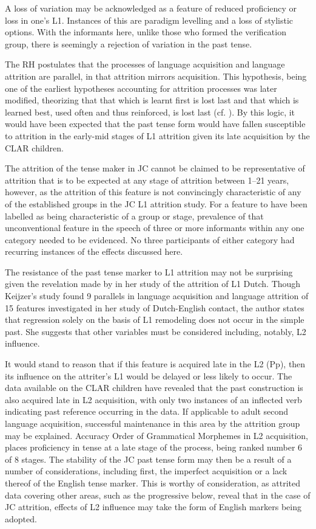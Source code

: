 \documentclass[output=paper,colorlinks,citecolor=brown]{langscibook}
\begin{document}
A loss of variation may be acknowledged as a feature of reduced proficiency or loss in one’s L1.  Instances of this are paradigm levelling and a loss of stylistic options. With the informants here, unlike those who formed the verification group, there is seemingly a rejection of variation in the past tense.


The RH postulates that the processes of language acquisition and language attrition are parallel, in that attrition mirrors acquisition. This hypothesis, being one of the earliest hypotheses accounting for attrition processes was later modified, theorizing that that which is learnt first is lost last and that which is learned best, used often and thus reinforced, is lost last (cf. \citealt[16]{KöpkeSchmid2004}). By this logic, it would have been expected that the past tense form would have fallen susceptible to attrition in the early-mid stages of L1 attrition given its late acquisition by the CLAR children.

The attrition of the tense maker in JC cannot be claimed to be representative of attrition that is to be expected at any stage of attrition between 1--21 years, however, as the attrition of this feature is not convincingly characteristic of any of the established groups in the JC L1 attrition study. For a feature to have been labelled as being characteristic of a group or stage, prevalence of that unconventional feature in the speech of three or more informants within any one category needed to be evidenced. No three participants of either category had recurring instances of the effects discussed here.

The resistance of the past tense marker to L1 attrition may not be surprising given the revelation made by \citet{Keijzer2010} in her study of the attrition of L1 Dutch. Though Keijzer’s study found 9 parallels in language acquisition and language attrition of 15 features investigated in her study of Dutch-English contact, the author states that regression solely on the basis of L1 remodeling does not occur in the simple past. She suggests that other variables must be considered including, notably, L2 influence.

It would stand to reason that if this feature is acquired late in the L2 (Pp), then its influence on the attriter’s L1 would be delayed or less likely to occur. The data available on the CLAR children have revealed that the past construction is also acquired late in L2 acquisition, with only two instances of an inflected verb indicating past reference occurring in the data. If applicable to adult second language acquisition, successful maintenance in this area by the attrition group may be explained.  Accuracy Order of Grammatical Morphemes in L2 acquisition, places proficiency in tense at a late stage of the process, being ranked number 6 of 8 stages. The stability of the JC past tense form may then be a result of a number of considerations, including first, the imperfect acquisition or a lack thereof of the English tense marker. This is worthy of consideration, as attrited data covering other areas, such as the progressive below, reveal that in the case of JC attrition, effects of L2 influence may take the form of English markers being adopted.
\end{document}

